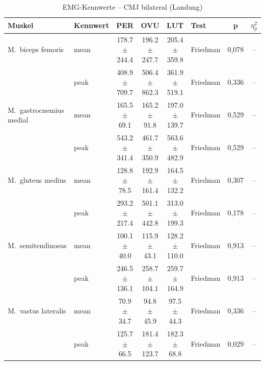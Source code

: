 \begin{table}[H]
  \centering
  \caption{EMG-Kennwerte – CMJ bilateral (Landung)}
  \label{tab:CMJ_bilateral_Landung}
  \small
  \begin{tabular}{l l c c c l c c}
    \hline
    \textbf{Muskel} & \textbf{Kennwert} & \textbf{PER} & \textbf{OVU} & \textbf{LUT} & \textbf{Test} & \textbf{p} & \textbf{$\eta^2_p$} \\
    \hline
    M.~biceps femoris & mean & 178.7 $\pm$ 244.4 & 196.2 $\pm$ 247.7 & 205.4 $\pm$ 359.8 & Friedman & 0{,}078 & -- \\
     & peak & 408.9 $\pm$ 709.7 & 506.4 $\pm$ 862.3 & 361.9 $\pm$ 519.1 & Friedman & 0{,}336 & -- \\
    \hline
    M.~gastrocnemius medial & mean & 165.5 $\pm$ 69.1 & 165.2 $\pm$ 91.8 & 197.0 $\pm$ 139.7 & Friedman & 0{,}529 & -- \\
     & peak & 543.2 $\pm$ 341.4 & 461.7 $\pm$ 350.9 & 563.6 $\pm$ 482.9 & Friedman & 0{,}529 & -- \\
    \hline
    M.~gluteus medius & mean & 128.8 $\pm$ 78.5 & 192.9 $\pm$ 161.4 & 164.5 $\pm$ 132.2 & Friedman & 0{,}307 & -- \\
     & peak & 293.2 $\pm$ 217.4 & 501.1 $\pm$ 442.8 & 313.0 $\pm$ 199.3 & Friedman & 0{,}178 & -- \\
    \hline
    M.~semitendinosus & mean & 100.1 $\pm$ 40.0 & 115.9 $\pm$ 43.1 & 128.2 $\pm$ 110.0 & Friedman & 0{,}913 & -- \\
     & peak & 246.5 $\pm$ 136.1 & 258.7 $\pm$ 104.1 & 259.7 $\pm$ 164.9 & Friedman & 0{,}913 & -- \\
    \hline
    M.~vastus lateralis & mean & 70.9 $\pm$ 34.7 & 94.8 $\pm$ 45.9 & 97.5 $\pm$ 44.3 & Friedman & 0{,}336 & -- \\
     & peak & 125.7 $\pm$ 66.5 & 181.4 $\pm$ 123.7 & 182.3 $\pm$ 68.8 & Friedman & 0{,}029 & -- \\
    \hline
  \end{tabular}
\end{table}

